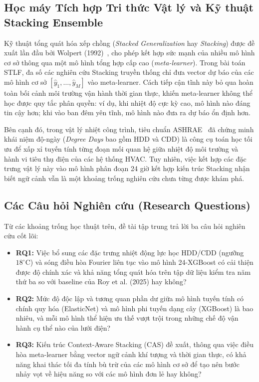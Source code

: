 \subsection{Học máy Tích hợp Tri thức Vật lý và Kỹ thuật Stacking Ensemble}
Kỹ thuật tổng quát hóa xếp chồng (\textit{Stacked Generalization} hay \textit{Stacking}) được đề xuất lần đầu bởi Wolpert (1992)~\cite{wolpert1992stacked}, cho phép kết hợp sức mạnh của nhiều mô hình cơ sở thông qua một mô hình tổng hợp cấp cao (\textit{meta-learner}). Trong bài toán STLF, đa số các nghiên cứu Stacking truyền thống chỉ đưa vector dự báo của các mô hình cơ sở $[\hat{y}_1, \dots, \hat{y}_M]$ vào meta-learner. Cách tiếp cận tĩnh này bỏ qua hoàn toàn bối cảnh môi trường vận hành thời gian thực, khiến meta-learner không thể học được quy tắc phân quyền: ví dụ, khi nhiệt độ cực kỳ cao, mô hình nào đáng tin cậy hơn; khi vào ban đêm yên tĩnh, mô hình nào đưa ra dự báo ổn định hơn.

Bên cạnh đó, trong vật lý nhiệt công trình, tiêu chuẩn ASHRAE~\cite{ashrae2021fundamentals} đã chứng minh khái niệm độ-ngày (\textit{Degree Days} bao gồm HDD và CDD) là công cụ toán học tối ưu để xấp xỉ tuyến tính từng đoạn mối quan hệ giữa nhiệt độ môi trường và hành vi tiêu thụ điện của các hệ thống HVAC. Tuy nhiên, việc kết hợp các đặc trưng vật lý này vào mô hình phân đoạn 24 giờ kết hợp kiến trúc Stacking nhận biết ngữ cảnh vẫn là một khoảng trống nghiên cứu chưa từng được khám phá.

\subsection{Các Câu hỏi Nghiên cứu (Research Questions)}
Từ các khoảng trống học thuật trên, đề tài tập trung trả lời ba câu hỏi nghiên cứu cốt lõi:
\begin{itemize}
    \item \textbf{RQ1:} Việc bổ sung các đặc trưng nhiệt động lực học HDD/CDD (ngưỡng $18^\circ\text{C}$) và sóng điều hòa Fourier liên tục vào mô hình 24-XGBoost có cải thiện được độ chính xác và khả năng tổng quát hóa trên tập dữ liệu kiểm tra năm thứ ba so với baseline của Roy et al. (2025) hay không?
    \item \textbf{RQ2:} Mức độ độc lập và tương quan phần dư giữa mô hình tuyến tính có chính quy hóa (ElasticNet) và mô hình phi tuyến dạng cây (XGBoost) là bao nhiêu, và mỗi mô hình thể hiện ưu thế vượt trội trong những chế độ vận hành cụ thể nào của lưới điện?
    \item \textbf{RQ3:} Kiến trúc Context-Aware Stacking (CAS) đề xuất, thông qua việc điều hòa meta-learner bằng vector ngữ cảnh khí tượng và thời gian thực, có khả năng khai thác tối đa tính bù trừ của các mô hình cơ sở để tạo nên bước nhảy vọt về hiệu năng so với các mô hình đơn lẻ hay không?
\end{itemize}
